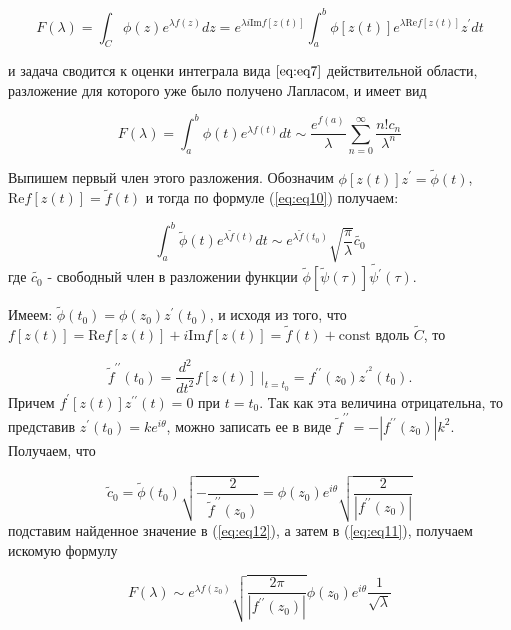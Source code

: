 \documentclass[14pt]{extarticle}
\renewcommand{\Re}{\mathrm{Re}}
\renewcommand{\Im}{\mathrm{Im}}
\newcommand{\const}{\mathrm{const}}
\renewcommand{\Re}{\mathrm{Re}}
\renewcommand{\Im}{\mathrm{Im}}
\begin{document}
	\begin{equation}\label{eq:eq11}
	F(\lambda) = \int_{C}^{}\phi(z) e^{\lambda f(z)}dz=e^{\lambda i \Im f[z(t)]}\int_{a}^{b}\phi[z(t)]e^{\lambda \Re f[z(t)]}z^{\prime} dt
	\end{equation}
	
	и задача сводится к оценки интеграла вида $\ref{eq:eq7}$ действительной области, разложение для которого уже было получено Лапласом, и имеет вид\cite{Lavrentyev}
	
	$$
	F(\lambda) = \int_{a}^{b}\phi(t)e^{\lambda f(t)}dt \sim \frac{e^{f(a)}}{\lambda}\sum_{n=0}^{\infty}\frac{n! c_n}{\lambda^n}
	$$
	
	Выпишем первый член этого разложения. Обозначим $\phi[z(t)]z^\prime = \widetilde{\phi}(t)$, $\Re f[z(t)] = \widetilde{f}(t)$ и тогда по формуле (\ref{eq:eq10}) получаем:
	
	\begin{equation}\label{eq:eq12}
	\int_{a}^{b} \widetilde{\phi}(t) e^{\lambda \widetilde{f}(t)}dt \sim e^{\lambda \widetilde{f}(t_0)} \sqrt{\frac{\pi}{\lambda}} \widetilde{c_0}
	\end{equation}
	где $\widetilde{c_0}$ - свободный член в разложении функции $\widetilde{\phi}[\widetilde{\psi}(\tau)]\widetilde{\psi^\prime}(\tau)$.
	
	Имеем: $\widetilde{\phi}(t_0) = \phi(z_0) z^\prime (t_0)$, и исходя из того, что $f[z(t)] = \Re f[z(t)]+ i \Im f[z(t)] = \widetilde{f}(t)+\const$ вдоль $\widetilde{C}$, то
	
	\begin{equation}\nonumber
	\widetilde{f}^{\prime\prime} (t_0) = \frac{d^2}{d t^2} f[z(t)]\;|_{t=t_0} = f^{\prime\prime} (z_0) z^{\prime^2} (t_0).
	\end{equation}
	Причем $f^\prime[z(t)] z^{\prime \prime} (t) = 0$ при $t=t_0$. Так как эта величина отрицательна, то представив $z^\prime (t_0) = k e^{i \theta}$, можно записать ее в виде $\widetilde{f}^{\prime\prime}=-|f^{\prime\prime}(z_0)| k^2$. Получаем, что 
	
	\begin{equation}\nonumber
	\widetilde{c}_0=\widetilde{\phi}(t_0) \sqrt{-\frac{2}{\widetilde{f}^{\prime\prime}(z_0)}}= \phi (z_0) e^{i \theta} \sqrt{\frac{2}{|f^{\prime\prime}(z_0)|}}
	\end{equation}
	подставим найденное значение в (\ref{eq:eq12}), а затем в (\ref{eq:eq11}), получаем искомую формулу
	
	\begin{equation}\label{eq:eq13}
	F(\lambda) \sim e^{\lambda f (z_0)}\sqrt{\frac{2\pi}{|f^{\prime \prime} (z_0)|}} \phi(z_0) e^{i \theta} \frac{1}{\sqrt{\lambda}}
	\end{equation}
	
\end{document}
